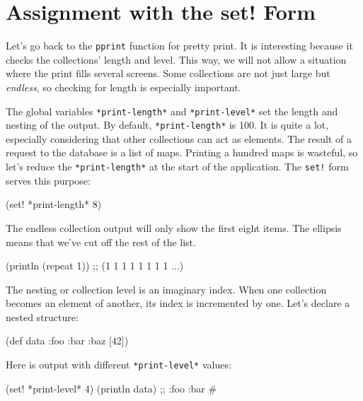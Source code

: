 \section{Assignment with the set! Form}


Let's go back to the \verb|pprint| function for pretty print. It is interesting because it checks the collections' length and level.
This way, we will not allow a situation where the print fills several screens.
Some collections are not just large but \emph{endless}, so checking for length is especially important.


The global variables \verb|*print-length*| and \verb|*print-level*| set the length and nesting of the output.
By default, \verb|*print-length*| is 100.
It is quite a lot, especially considering that other collections can act as elements.
The result of a request to the database is a list of maps. Printing a hundred maps is wasteful, so let's reduce the \verb|*print-length*| at the start of the application. The \verb|set!| form serves this purpose:

\begin{clojure}
(set! *print-length* 8)
\end{clojure}

The endless collection output will only show the first eight items. The ellipsis means that we've cut off the rest of the list.

\begin{clojure}
(println (repeat 1))
;; (1 1 1 1 1 1 1 1 ...)
\end{clojure}

The nesting or collection level is an imaginary index.
When one collection becomes an element of another, its index is incremented by one.
Let's declare a nested structure:

\begin{clojure}
(def data {:foo
            {:bar
              {:baz [42]}}})
\end{clojure}

Here is output with different \texttt{*print\--le\-vel*} values:

\ifx\DEVICETYPE\MOBILE

\begin{clojure}
(set! *print-level* 4)
(println data)
;; {:foo {:bar #}}
\end{clojure}

